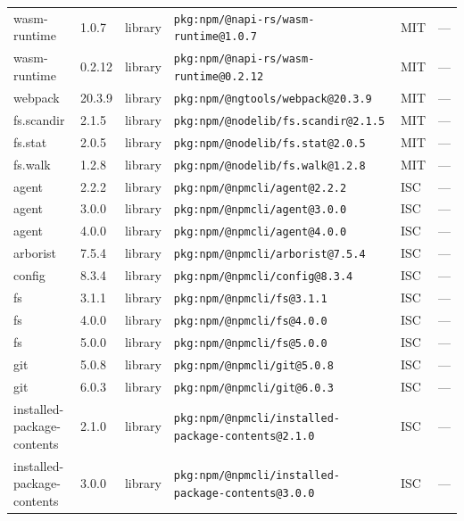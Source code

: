 \documentclass[11pt,a4paper]{article}
\begin{document}
\begin{longtable}{|p{4cm}|p{2cm}|p{1.6cm}|p{5cm}|p{1.5cm}|p{3.5cm}|}
\raggedright wasm-runtime & 1.0.7 & library & \small\texttt{pkg:npm/@napi-rs/wasm-runtime@1.0.7} & MIT & \small — \\
\raggedright wasm-runtime & 0.2.12 & library & \small\texttt{pkg:npm/@napi-rs/wasm-runtime@0.2.12} & MIT & \small — \\
\raggedright webpack & 20.3.9 & library & \small\texttt{pkg:npm/@ngtools/webpack@20.3.9} & MIT & \small — \\
\raggedright fs.scandir & 2.1.5 & library & \small\texttt{pkg:npm/@nodelib/fs.scandir@2.1.5} & MIT & \small — \\
\raggedright fs.stat & 2.0.5 & library & \small\texttt{pkg:npm/@nodelib/fs.stat@2.0.5} & MIT & \small — \\
\raggedright fs.walk & 1.2.8 & library & \small\texttt{pkg:npm/@nodelib/fs.walk@1.2.8} & MIT & \small — \\
\raggedright agent & 2.2.2 & library & \small\texttt{pkg:npm/@npmcli/agent@2.2.2} & ISC & \small — \\
\raggedright agent & 3.0.0 & library & \small\texttt{pkg:npm/@npmcli/agent@3.0.0} & ISC & \small — \\
\raggedright agent & 4.0.0 & library & \small\texttt{pkg:npm/@npmcli/agent@4.0.0} & ISC & \small — \\
\raggedright arborist & 7.5.4 & library & \small\texttt{pkg:npm/@npmcli/arborist@7.5.4} & ISC & \small — \\
\raggedright config & 8.3.4 & library & \small\texttt{pkg:npm/@npmcli/config@8.3.4} & ISC & \small — \\
\raggedright fs & 3.1.1 & library & \small\texttt{pkg:npm/@npmcli/fs@3.1.1} & ISC & \small — \\
\raggedright fs & 4.0.0 & library & \small\texttt{pkg:npm/@npmcli/fs@4.0.0} & ISC & \small — \\
\raggedright fs & 5.0.0 & library & \small\texttt{pkg:npm/@npmcli/fs@5.0.0} & ISC & \small — \\
\raggedright git & 5.0.8 & library & \small\texttt{pkg:npm/@npmcli/git@5.0.8} & ISC & \small — \\
\raggedright git & 6.0.3 & library & \small\texttt{pkg:npm/@npmcli/git@6.0.3} & ISC & \small — \\
\raggedright installed-package-contents & 2.1.0 & library & \small\texttt{pkg:npm/@npmcli/installed-package-contents@2.1.0} & ISC & \small — \\
\raggedright installed-package-contents & 3.0.0 & library & \small\texttt{pkg:npm/@npmcli/installed-package-contents@3.0.0} & ISC & \small — \\

\end{longtable}
\end{document}
